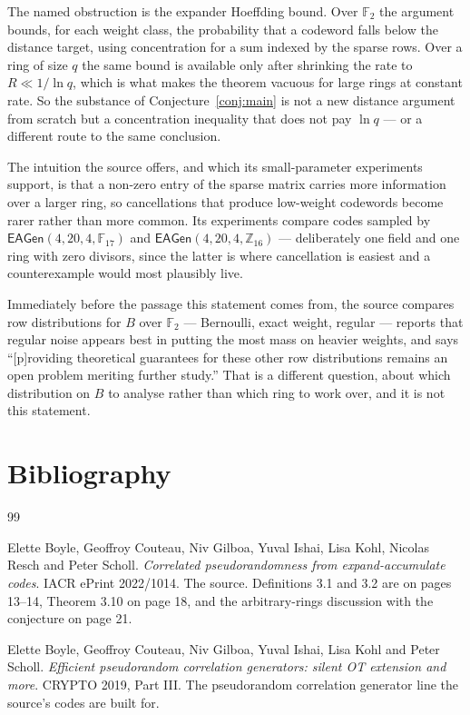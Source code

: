 \documentclass{aicr-conjecture}
\newcommand{\F}{\mathbb{F}}
\newcommand{\EAGen}{\mathsf{EAGen}}
\begin{document}
\begin{remark}\label{rem:obstruction}
The named obstruction is the expander Hoeffding bound. Over $\F_{2}$ the
argument bounds, for each weight class, the probability that a codeword
falls below the distance target, using concentration for a sum indexed by
the sparse rows. Over a ring of size $q$ the same bound is available only
after shrinking the rate to $R \ll 1/\ln q$, which is what makes the
theorem vacuous for large rings at constant rate. So the substance of
Conjecture~\ref{conj:main} is not a new distance argument from scratch
but a concentration inequality that does not pay $\ln q$ --- or a different
route to the same conclusion.
\end{remark}

\begin{remark}
The intuition the source offers, and which its small-parameter
experiments support, is that a non-zero entry of the sparse matrix
carries more information over a larger ring, so cancellations that
produce low-weight codewords become rarer rather than more common. Its
experiments compare codes sampled by $\EAGen(4,20,4,\F_{17})$ and
$\EAGen(4,20,4,\mathbb{Z}_{16})$ --- deliberately one field and one ring
with zero divisors, since the latter is where cancellation is easiest and
a counterexample would most plausibly live.
\end{remark}

\begin{remark}
Immediately before the passage this statement comes from, the source
compares row distributions for $B$ over $\F_{2}$ --- Bernoulli, exact
weight, regular --- reports that regular noise appears best in putting the
most mass on heavier weights, and says ``[p]roviding theoretical
guarantees for these other row distributions remains an open problem
meriting further study.'' That is a different question, about which
distribution on $B$ to analyse rather than which ring to work over, and it
is not this statement.
\end{remark}

\section{Bibliography}

\begin{aicrbibliography}{99}

Elette Boyle, Geoffroy Couteau, Niv Gilboa, Yuval Ishai, Lisa Kohl,
Nicolas Resch and Peter Scholl.
\emph{Correlated pseudorandomness from expand-accumulate codes}.
IACR ePrint 2022/1014.
The source. Definitions 3.1 and 3.2 are on pages 13--14, Theorem 3.10 on
page 18, and the arbitrary-rings discussion with the conjecture on
page 21.

Elette Boyle, Geoffroy Couteau, Niv Gilboa, Yuval Ishai, Lisa Kohl and
Peter Scholl.
\emph{Efficient pseudorandom correlation generators: silent OT extension
and more}.
CRYPTO 2019, Part III\@.
The pseudorandom correlation generator line the source's codes are built
for.

\end{aicrbibliography}
\end{document}
